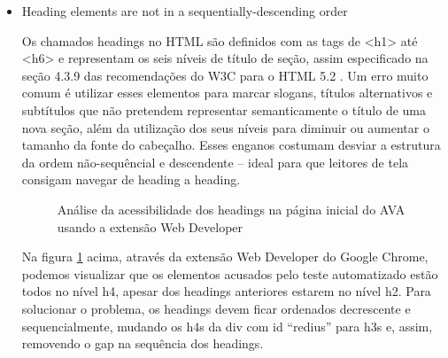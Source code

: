 \documentclass[
	12pt,				%
	openright,			%
	oneside,			%
	a4paper,			%
	chapter=TITLE,		%
	section=TITLE,		%
	subsection=TITLE,	%
	subsubsection=TITLE,%
	english,			%
	brazil				%
	]{abntex2}
\theoremstyle{definition}
\begin{document}
\begin{itemize}
 \item Heading elements are not in a sequentially-descending order
   
Os chamados headings no HTML são definidos com as tags de <h1> até <h6> e representam os seis níveis de título de seção, assim especificado na seção 4.3.9 das recomendações do W3C para o HTML 5.2 \cite{caldwell2008web}. Um erro muito comum é utilizar esses elementos para marcar slogans, títulos alternativos e subtítulos que não pretendem representar semanticamente o título de uma nova seção, além da utilização dos seus níveis para diminuir ou aumentar o tamanho da fonte do cabeçalho. Esses enganos costumam desviar a estrutura da ordem não-sequêncial e descendente – ideal para que leitores de tela consigam navegar de heading a heading.

\begin{figure}[!h]
\centering
\caption{Análise da acessibilidade dos headings na página inicial do AVA usando a extensão Web Developer}
\label{Análise da acessibilidade dos headings na página inicial do AVA usando a extensão Web Developer}
\end{figure}

\pagebreak

Na figura \ref{Análise da acessibilidade dos headings na página inicial do AVA usando a extensão Web Developer} acima, através da extensão Web Developer do Google Chrome, podemos visualizar que os elementos acusados pelo teste automatizado estão todos no nível h4, apesar dos headings anteriores estarem no nível h2. Para solucionar o problema, os headings devem ficar ordenados decrescente e sequencialmente, mudando os h4s da div com id “redius” para h3s e, assim, removendo o gap na sequência dos headings.


\end{itemize}
\end{document}

